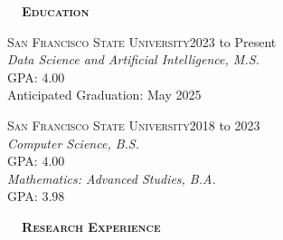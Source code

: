 \documentclass[hidelinks, 10.5pt]{article}
\def\contentwidth{0.9\linewidth}    %
\def\contentspacing{2.5mm}          %
\def\sectionspacing{8mm}            %
\def\sectiontocontentspacing{4mm}   %
\renewcommand{\section}[1]{
    {\fontsize{14}{14}\selectfont \textsc{\textbf{\ \ #1\ \ }}}\hrulefill
}
\begin{document}
{\centering
\vspace{\contentspacing}

\section{Education}

\vspace{\sectiontocontentspacing}

\begin{minipage}[ct]{0.9\linewidth}
    {\textsc{San Francisco State University}}\hfill 2023 to Present\\
    \emph{Data Science and Artificial Intelligence, M.S.}\\
    GPA: $4.00$\\
    Anticipated Graduation: May 2025
\end{minipage}

\vspace{\contentspacing}

\begin{minipage}[ct]{\contentwidth}
    {\textsc{San Francisco State University}}\hfill 2018 to 2023\\
    \emph{Computer Science, B.S.}\\
    GPA: $4.00$\\
    \emph{Mathematics: Advanced Studies, B.A.}\\
    GPA: $3.98$
\end{minipage}



\vspace{\sectionspacing}
{\centering


    \section{Research Experience}

    \vspace{\sectiontocontentspacing}

}}
\end{document}
